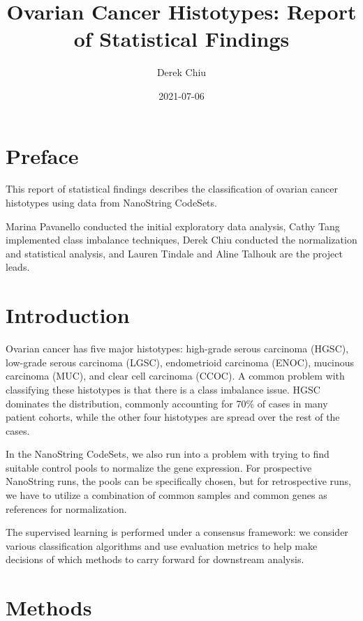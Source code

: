 \documentclass[
]{report}
\title{Ovarian Cancer Histotypes: Report of Statistical Findings}
\author{Derek Chiu}
\date{2021-07-06}
\begin{document}
\maketitle

{
\hypersetup{linkcolor=}
\setcounter{tocdepth}{1}
\tableofcontents
}
\listoftables
\listoffigures
\hypertarget{preface}{%
\chapter*{Preface}\label{preface}}

This report of statistical findings describes the classification of ovarian cancer histotypes using data from NanoString CodeSets.

Marina Pavanello conducted the initial exploratory data analysis, Cathy Tang implemented class imbalance techniques, Derek Chiu conducted the normalization and statistical analysis, and Lauren Tindale and Aline Talhouk are the project leads.

\hypertarget{introduction}{%
\chapter{Introduction}\label{introduction}}

Ovarian cancer has five major histotypes: high-grade serous carcinoma (HGSC), low-grade serous carcinoma (LGSC), endometrioid carcinoma (ENOC), mucinous carcinoma (MUC), and clear cell carcinoma (CCOC). A common problem with classifying these histotypes is that there is a class imbalance issue. HGSC dominates the distribution, commonly accounting for 70\% of cases in many patient cohorts, while the other four histotypes are spread over the rest of the cases.

In the NanoString CodeSets, we also run into a problem with trying to find suitable control pools to normalize the gene expression. For prospective NanoString runs, the pools can be specifically chosen, but for retrospective runs, we have to utilize a combination of common samples and common genes as references for normalization.

The supervised learning is performed under a consensus framework: we consider various classification algorithms and use evaluation metrics to help make decisions of which methods to carry forward for downstream analysis.

\hypertarget{methods}{%
\chapter{Methods}\label{methods}}
\end{document}
